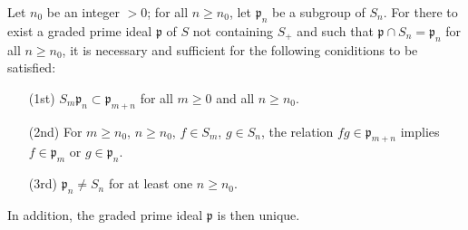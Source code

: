 \begin{proposition}[2.1.9]
\label{II.2.1.9}
Let $n_0$ be an integer $>0$;
for all $n\geq n_0$, let $\mathfrak{p}_n$ be a subgroup of $S_n$.
For there to exist a graded prime ideal $\mathfrak{p}$ of $S$ not containing $S_+$ and such that $\mathfrak{p}\cap S_n=\mathfrak{p}_n$ for all $n\geq n_0$, it is necessary and sufficient for the following coniditions to be satisfied:
\begin{enumerate}
  \item[{\rm(1st)}] $S_m\mathfrak{p}_n\subset\mathfrak{p}_{m+n}$ for all $m\geq 0$ and all $n\geq n_0$.
  \item[{\rm(2nd)}] For $m\geq n_0$, $n\geq n_0$, $f\in S_m$, $g\in S_n$, the relation $fg\in\mathfrak{p}_{m+n}$ implies $f\in\mathfrak{p}_m$ or $g\in\mathfrak{p}_n$.
  \item[{\rm(3rd)}] $\mathfrak{p}_n\neq S_n$ for at least one $n\geq n_0$.
\end{enumerate}
In addition, the graded prime ideal $\mathfrak{p}$ is then unique.
\end{proposition}

